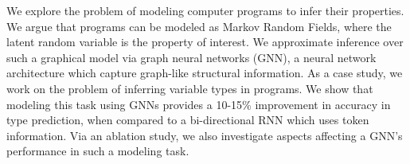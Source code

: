 We explore the problem of modeling computer programs to infer their properties. We argue that programs can be modeled as Markov Random Fields, where the latent random variable is the property of interest. We approximate inference over such a graphical model via graph neural networks (GNN), a neural network architecture which capture graph-like structural information. As a case study, we work on the problem of inferring variable types in programs. We show that modeling this task using GNNs provides a 10-15\% improvement in accuracy in type prediction, when compared to a bi-directional RNN which uses token information. Via an ablation study, we also investigate aspects affecting a GNN's performance in such a modeling task.